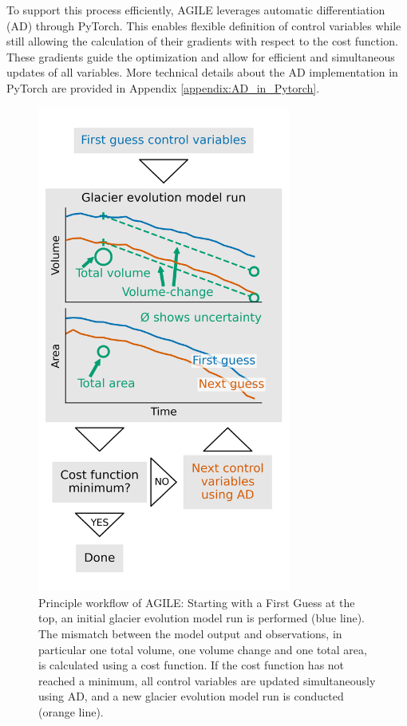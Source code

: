 \documentclass[journal abbreviation, manuscript]{copernicus}
\begin{document}
To support this process efficiently, AGILE leverages automatic differentiation (AD) through PyTorch. This enables flexible definition of control variables while still allowing the calculation of their gradients with respect to the cost function. These gradients guide the optimization and allow for efficient and simultaneous updates of all variables. More technical details about the AD implementation in PyTorch are provided in Appendix \ref{appendix:AD_in_Pytorch}.

\begin{figure}[t]
\includegraphics[width=8.3cm]{fig01.png}
\caption{Principle workflow of AGILE: Starting with a First Guess at the top, an initial glacier evolution model run is performed (blue line). The mismatch between the model output and observations, in particular one total volume, one volume change and one total area, is calculated using a cost function. If the cost function has not reached a minimum, all control variables are updated simultaneously using AD, and a new glacier evolution model run is conducted (orange line).}
\label{fig:fundamental_principle}
\end{figure}
\end{document}
